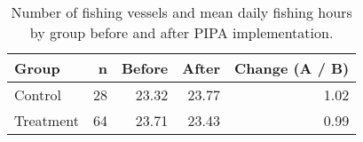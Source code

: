\begin{table}[H]

\caption{\label{tab:}\label{tab:baci_n_s}Number of fishing vessels and mean daily fishing hours by group before and after PIPA implementation.}
\centering
\begin{tabular}[t]{lrrrr}
\toprule
Group & n & Before & After & Change (A / B)\\
\midrule
Control & 28 & 23.32 & 23.77 & 1.02\\
Treatment & 64 & 23.71 & 23.43 & 0.99\\
\bottomrule
\end{tabular}
\end{table}